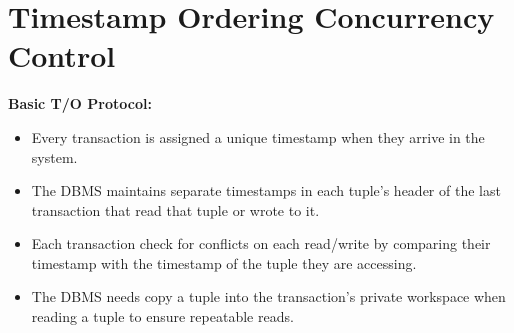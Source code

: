 \documentclass[11pt]{article}
\begin{document}
\section{Timestamp Ordering Concurrency Control}
\textbf{Basic T/O Protocol:}
\begin{itemize}
    \item
    Every transaction is assigned a unique timestamp when they arrive in the system.
    
    \item
    The DBMS maintains separate timestamps in each tuple's header of the last transaction that read 
    that tuple or wrote to it.
    
    \item
    Each transaction check for conflicts on each read/write by comparing their timestamp with the 
    timestamp of the tuple they are accessing.
    
    \item
    The DBMS needs copy a tuple into the transaction's private workspace when reading a tuple to 
    ensure repeatable reads.
\end{itemize}
\end{document}
